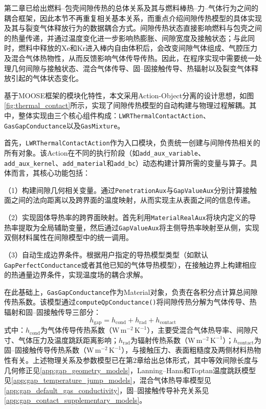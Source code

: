 
第二章已给出燃料--包壳间隙传热的总体关系及其与燃料棒热--力--气体行为之间的耦合框架，因此本节不再重复相关基本关系，而重点介绍间隙传热模型的具体实现及其与裂变气体释放行为的数据耦合方式。间隙传热状态直接影响燃料与包壳之间的热量传递，并通过温度变化进一步影响热膨胀、间隙宽度及接触状态；与此同时，燃料中释放的Xe和Kr进入棒内自由体积后，会改变间隙气体组成、气腔压力及混合气体热物性，从而反馈影响气体传导传热。因此，在程序实现中需要统一处理几何间隙与接触状态、混合气体传导、固--固接触传导、热辐射以及裂变气体释放引起的气体状态变化。

基于MOOSE框架的模块化特性，本文采用Action-Object分离的设计思想，如图\ref{fig:thermal_contact}所示，实现了间隙传热模型的自动构建与物理过程解耦。其中，整体实现由三个核心组件构成：\texttt{LWRThermalContactAction}、\texttt{GasGapConductance}以及\texttt{GasMixture}。

首先，\texttt{LWRThermalContactAction}作为入口模块，负责统一创建与间隙传热相关的所有对象。该Action在不同的执行阶段（如\texttt{add\_aux\_variable}、\texttt{add\_aux\_kernel}、\texttt{add\_material}和\texttt{add\_bc}）动态构建计算所需的变量与算子。具体而言，其核心功能包括：

（1）构建间隙几何相关变量。通过\texttt{PenetrationAux}与\texttt{GapValueAux}分别计算接触面之间的法向距离以及跨界面的温度映射，从而实现主从表面之间的信息传递。

（2）实现固体导热率的跨界面映射。首先利用\texttt{MaterialRealAux}将块内定义的导热率提取为全局辅助变量，然后通过\texttt{GapValueAux}将主侧导热率映射至从侧，实现双侧材料属性在间隙模型中的统一调用。

（3）自动生成边界条件。根据用户指定的导热模型类型（如默认\texttt{GapPerfectConductance}或者其他已知的气体导热模型），在接触边界上构建相应的热通量边界条件，实现温度场的耦合求解。

在此基础上，\texttt{GasGapConductance}作为Material对象，负责在各积分点计算总间隙传热系数。该模型通过\texttt{computeQpConductance()}将间隙传热分解为气体传导、热辐射和固--固接触传导三部分：
\begin{equation}
	h_{\text{gap}}
	=
	h_{\text{cond}}
	+
	h_{\text{rad}}
	+
	h_{\text{contact}}
\end{equation}
\noindent 式中：$h_{\text{cond}}$为气体传导传热系数（$\mathrm{W\,m^{-2}\,K^{-1}}$），主要受混合气体热导率、间隙尺寸、气体压力及温度跳跃距离影响；$h_{\text{rad}}$为辐射传热系数（$\mathrm{W\,m^{-2}\,K^{-1}}$）；$h_{\text{contact}}$为固--固接触传导传热系数（$\mathrm{W\,m^{-2}\,K^{-1}}$），与接触压力、表面粗糙度及两侧材料热物性有关。上述物理关系及参数模型已在第2章给出总体形式，其中等效间隙长度与几何修正见\ref{app:gap_geometry_models}，Lanning--Hann和Toptan温度跳跃模型见\ref{app:gap_temperature_jump_models}，混合气体热导率模型见\ref{app:gap_default_gas_conductivity}，固--固接触传导补充关系见\ref{app:gap_contact_supplementary_models}。

